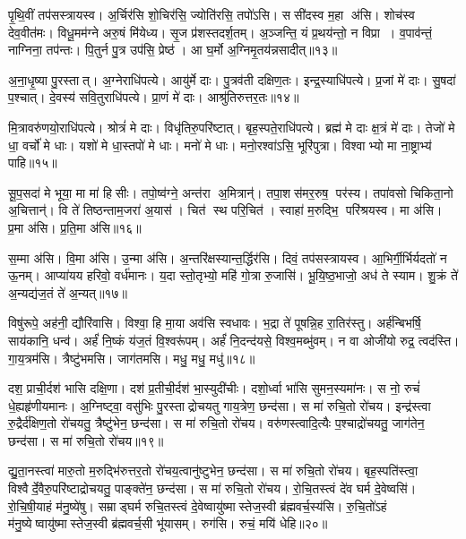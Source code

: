 पृ॒थि॒वीं तप॑सस्त्रायस्व। अ॒र्चिर॑सि शो॒चिर॑सि॒ ज्योति॑रसि॒ तपो॑ऽसि। ससी॑दस्व म॒हा अ॑सि। शोच॑स्व देव॒वीत॑मः। विधू॒मम॑ग्ने अरु॒षं मि॑येध्य। सृ॒ज प्र॑शस्तदर्\mbox{}श॒तम्। अ॒ञ्जन्ति॒ यं प्र॒थय॑न्तो॒ न विप्रा। व॒पाव॑न्तं॒ नाग्निना॒ तप॑न्तः। पि॒तुर्न पु॒त्र उप॑सि॒ प्रेष्ठ॑। आ घ॒र्मो अ॒ग्निमृ॒तय॑न्नसादीत्॥१३॥

अ॒ना॒धृ॒ष्या पु॒रस्तात्। अ॒ग्नेराधि॑पत्ये। आयु॑र्मे दाः। पु॒त्रव॑ती दक्षिण॒तः। इन्द्र॒स्याधि॑पत्ये। प्र॒जां मे॑ दाः। सु॒षदा॑ प॒श्चात्। दे॒वस्य॑ सवि॒तुराधि॑पत्ये। प्रा॒णं मे॑ दाः। आश्रु॑तिरुत्तर॒तः॥१४॥

मि॒त्रावरु॑णयो॒राधि॑पत्ये। श्रोत्रं॑ मे दाः। विधृ॑तिरु॒परि॑ष्टात्। बृह॒स्पते॒राधि॑पत्ये। ब्रह्म॑ मे दाः क्ष॒त्रं मे॑ दाः। तेजो॑ मे धा॒ वर्चो॑ मे धाः। यशो॑ मे धा॒स्तपो॑ मे धाः। मनो॑ मे धाः। मनो॒रश्वा॑ऽसि॒ भूरि॑पुत्रा। विश्वाभ्यो मा ना॒ष्ट्राभ्य॑ पाहि॥१५॥

सू॒प॒सदा॑ मे भूया॒ मा मा॑ हिसीः। तपो॒ष्व॑ग्ने॒ अन्त॑रा अ॒मित्रान्॑। तपा॒शस॑मर॒रुष॒ पर॑स्य। तपा॑वसो चिकिता॒नो अ॒चित्तान्॑। वि ते॑ तिष्ठन्ताम॒जरा॑ अ॒यास॑। चित॑ स्थ परि॒चित॑। स्वाहा॑ म॒रुद्भि॒ परि॑श्रयस्व। मा अ॑सि। प्र॒मा अ॑सि। प्र॒ति॒मा अ॑सि॥१६॥

स॒म्मा अ॑सि। वि॒मा अ॑सि। उ॒न्मा अ॑सि। अ॒न्तरि॑क्षस्यान्त॒र्द्धि\-र॑सि। दिवं॒ तप॑सस्त्रायस्व। आ॒भिर्गी॒र्भिर्यदतो॑ न ऊ॒नम्। आप्या॑यय हरिवो॒ वर्ध॑मानः। य॒दा स्तो॒तृभ्यो॒ महि॑ गो॒त्रा रु॒जासि॑। भू॒यि॒ष्ठ॒भाजो॒ अध॑ ते स्याम। शु॒क्रं ते॑ अ॒न्यद्य॑ज॒तं ते॑ अ॒न्यत्॥१७॥

विषु॑रूपे॒ अह॑नी॒ द्यौरि॑वासि। विश्वा॒ हि मा॒या अव॑सि स्वधावः। भ॒द्रा ते॑ पूषन्नि॒ह रा॒तिर॑स्तु। अर्\mbox{}ह॑न्बिभर्\mbox{}षि॒ साय॑कानि॒ धन्व॑। अर्\mbox{}हं॑ नि॒ष्कं य॑ज॒तं  वि॒श्वरू॑पम्। अर्\mbox{}हं॑ नि॒दन्द॑यसे॒ विश्व॒मब्भु॑वम्। न वा ओजी॑यो रुद्र॒ त्वद॑स्ति। गा॒य॒त्रम॑सि। त्रैष्टु॑भमसि। जाग॑तमसि। मधु॒ मधु॒ मधु॑॥१८॥
\anuvakamend[अ॒न॒क्त्व॒सा॒दी॒दु॒त्त॒र॒तः पा॑हि प्रति॒मा अ॑सि यज॒तन्ते॑ अ॒न्यज्जाग॑तम॒स्येकं॑ च]

दश॒ प्राची॒र्दश॑ भासि दक्षि॒णा। दश॑ प्र॒तीची॒र्दश॑ भा॒स्युदी॑चीः। दशो॒र्ध्वा भा॑सि सुमन॒स्यमा॑नः। स नो॒ रुचं॑ धे॒ह्यहृ॑णीयमानः। अ॒ग्निष्ट्वा॒ वसु॑भिः पु॒रस्ताद्रोचयतु गाय॒त्रेण॒ छन्द॑सा। स मा॑ रुचि॒तो रो॑चय। इन्द्र॑स्त्वा रु॒द्रैर्द॑क्षिण॒तो रो॑चयतु॒ त्रैष्टु॑भेन॒ छन्द॑सा। स मा॑ रुचि॒तो रो॑चय। वरु॑णस्त्वादि॒त्यैः प॒श्चाद्रो॑चयतु॒ जाग॑तेन॒ छन्द॑सा। स मा॑ रुचि॒तो रो॑चय॥१९॥

द्यु॒ता॒नस्त्वा॑ मारु॒तो म॒रुद्भि॑रुत्तर॒तो रो॑चय॒त्वानु॑ष्टुभेन॒ छन्द॑सा। स मा॑ रुचि॒तो रो॑चय। बृह॒स्पति॑स्त्वा॒ विश्वैर्दे॒वैरु॒परि॑ष्टाद्रोचयतु॒ पाङ्क्ते॑न॒ छन्द॑सा। स मा॑ रुचि॒तो रो॑चय। रो॒चि॒तस्त्वं दे॑व घर्म दे॒वेष्वसि॑। रो॒चि॒षी॒याहं म॑नु॒ष्ये॑षु। सम्राड्घर्म रुचि॒तस्त्वं दे॒वेष्वायु॑ष्मास्तेज॒स्वी ब्र॑ह्मवर्च॒स्य॑सि। रु॒चि॒तो॑ऽहं म॑नु॒ष्येष्वायु॑ष्मास्तेज॒स्वी ब्र॑ह्मवर्च॒सी भू॑यासम्। रुग॑सि। रुचं॒ मयि॑ धेहि॥२०॥

